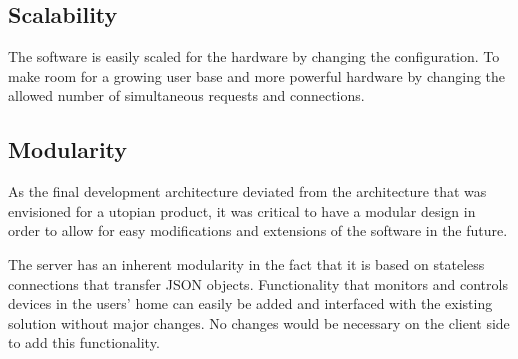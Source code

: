 \subsection{Scalability}
The software is easily scaled for the hardware by changing the configuration. To make room for a growing user base and more powerful hardware by changing the allowed number of simultaneous requests and connections.

\subsection{Modularity}
\label{sec:modularity}
As the final development architecture deviated from the architecture that was envisioned for a utopian product, it was critical to have a modular design in order to allow for easy modifications and extensions of the software in the future. 

The server has an inherent modularity in the fact that it is based on stateless connections that transfer JSON objects. Functionality that monitors and controls devices in the users' home can easily be added and interfaced with the existing solution without major changes. No changes would be necessary on the client side to add this functionality.
